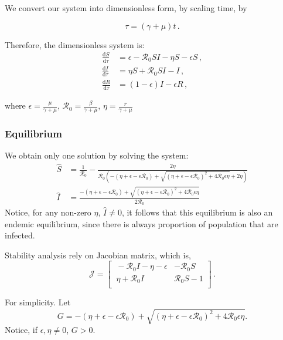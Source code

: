\documentclass[12pt]{article}
\newcommand\dbyd[2]{\frac{\mathrm d{#1}}{\mathrm d{#2}}}
\newcommand{\R}{\mathcal{R}}
\begin{document}
We convert our system into dimensionless form, by scaling time, by

\begin{equation}
\tau=(\gamma+\mu)t\,.
\end{equation}

Therefore, the dimensionless system is:
\begin{equation}
\begin{split}
\dbyd{S}{\tau}&=\epsilon- \R_0  SI-\eta S-\epsilon S\,, \\
\dbyd{I}{\tau}&=\eta S+\R_0 SI-I\,,\\
\dbyd{R}{\tau}&=(1-\epsilon)I-\epsilon R\,,
\end{split}
\end{equation}

where $\epsilon=\frac{\mu}{\gamma+\mu}$, $\R_0=\frac{\beta}{\gamma+\mu}$, $\eta=\frac{r}{\gamma+\mu}$

\subsubsection{Equilibrium}
We obtain only one solution by solving the system:
\begin{subequations}
\begin{align}
\hat{S} &= \frac{1}{\R_0}-\frac{2\eta}{\R_0(-(\eta+\epsilon-\epsilon\R_0)+\sqrt{(\eta+\epsilon-\epsilon\R_0)^2+4\R_0\epsilon \eta}+2\eta)}\\
\hat{I} &= \frac{-(\eta+\epsilon-\epsilon\R_0)+\sqrt{(\eta+\epsilon-\epsilon\R_0)^2+4\R_0\epsilon \eta}}{2\R_0}
\end{align}
\end{subequations}
Notice, for any non-zero $\eta$, $\hat{I}\neq 0$, it follows that this equilibrium is also an endemic equilibrium, since there is always proportion of population that are infected.

Stability analysis rely on Jacobian matrix, which is,
\begin{equation}
\mathcal{J} =
\begin{bmatrix}
    \ -\R_0 I-\eta-\epsilon       & -\R_0 S \\
    \ \eta+\R_0 I       & \R_0 S-1 \\
\end{bmatrix}\,.
\end{equation}

For simplicity. Let 
\begin{equation}
G=-(\eta+\epsilon-\epsilon\R_0)+\sqrt{(\eta+\epsilon-\epsilon\R_0)^2+4\R_0\epsilon \eta}.
\end{equation}
Notice, if $\epsilon,\eta\neq 0$, $G>0$. 
\end{document}
